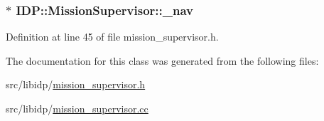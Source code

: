 \hypertarget{classIDP_1_1MissionSupervisor_a37b2c2cd7a79ecfbc7459382b7febcc3}{
\subsubsection[{\_\-nav}]{$\ast$ {\bf IDP::MissionSupervisor::\_\-nav}}}
\label{classIDP_1_1MissionSupervisor_a37b2c2cd7a79ecfbc7459382b7febcc3}


Definition at line 45 of file mission\_\-supervisor.h.



The documentation for this class was generated from the following files:\begin{DoxyCompactItemize}
\item 
src/libidp/\hyperlink{mission__supervisor_8h}{mission\_\-supervisor.h}\item 
src/libidp/\hyperlink{mission__supervisor_8cc}{mission\_\-supervisor.cc}\end{DoxyCompactItemize}
